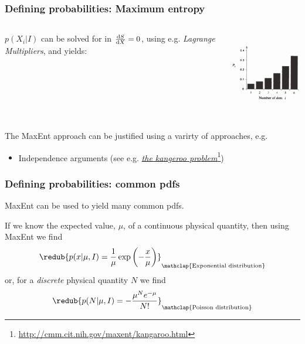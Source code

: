 \begin{frame}

\frametitle{Defining probabilities: Maximum entropy}
\label{definingprobabilities:maximumentropy}

\begin{columns}
     \begin{column}{0.5\textwidth}

$p(X_i|I)$ can be solved for in $\frac{{\rm d}S}{{\rm d}X} = 0$, using e.g. \emph{Lagrange Multipliers}, and yields:
\end{column}
\begin{column}{0.5\textwidth}
\includegraphics[keepaspectratio,width=\textwidth,height=100pt]{figures/maxent.png}
\end{column}
\end{columns}

The MaxEnt approach can be justified using a varirty of approaches, e.g.

\begin{itemize}
\item Independence arguments (see e.g. \href{http://cmm.cit.nih.gov/maxent/kangaroo.html}{\emph{the kangeroo problem}}\footnote{\href{http://cmm.cit.nih.gov/maxent/kangaroo.html}{http:/\slash cmm.cit.nih.gov\slash maxent\slash kangaroo.html}})

\end{itemize}

\end{frame}

\begin{frame}

\frametitle{Defining probabilities: common pdfs}
\label{definingprobabilities:commonpdfs}

MaxEnt can be used to yield many common pdfs.

If we know the expected value, $\mu$, of a continuous physical quantity, then using MaxEnt we find
\[
\redub{p(x|\mu,I) = \frac{1}{\mu}\exp{\left(-\frac{x}{\mu}\right)}}_{\mathclap{\text{Exponential distribution}}}
\]
or, for a \emph{discrete} physical quantity $N$ we find
\[
\redub{p(N|\mu,I) = -\frac{\mu^N e^{-\mu}}{N!}}_{\mathclap{\text{Poisson distribution}}}
\]

\end{frame}

